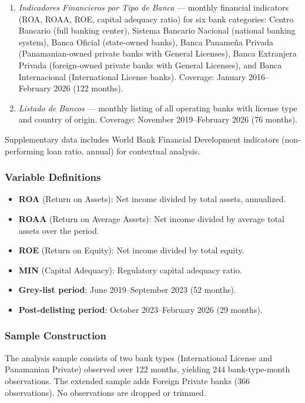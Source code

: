 \documentclass[12pt]{article}
\begin{document}
\begin{enumerate}
\item \textit{Indicadores Financieros por Tipo de Banca} --- monthly financial indicators (ROA, ROAA, ROE, capital adequacy ratio) for six bank categories: Centro Bancario (full banking center), Sistema Bancario Nacional (national banking system), Banca Oficial (state-owned banks), Banca Paname\~na Privada (Panamanian-owned private banks with General Licenses), Banca Extranjera Privada (foreign-owned private banks with General Licenses), and Banca Internacional (International License banks). Coverage: January 2016--February 2026 (122 months).

\item \textit{Listado de Bancos} --- monthly listing of all operating banks with license type and country of origin. Coverage: November 2019--February 2026 (76 months).
\end{enumerate}

Supplementary data includes World Bank Financial Development indicators (non-performing loan ratio, annual) for contextual analysis.

\subsubsection*{Variable Definitions}
\begin{itemize}
\item \textbf{ROA} (Return on Assets): Net income divided by total assets, annualized.
\item \textbf{ROAA} (Return on Average Assets): Net income divided by average total assets over the period.
\item \textbf{ROE} (Return on Equity): Net income divided by total equity.
\item \textbf{MIN} (Capital Adequacy): Regulatory capital adequacy ratio.
\item \textbf{Grey-list period}: June 2019--September 2023 (52 months).
\item \textbf{Post-delisting period}: October 2023--February 2026 (29 months).
\end{itemize}

\subsubsection*{Sample Construction}
The analysis sample consists of two bank types (International License and Panamanian Private) observed over 122 months, yielding 244 bank-type-month observations. The extended sample adds Foreign Private banks (366 observations). No observations are dropped or trimmed.
\end{document}
